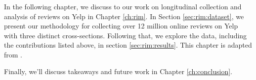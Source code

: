 In the following chapter, we discuss to our work on longitudinal collection and analysis of reviews on Yelp in Chapter \ref{ch:rim}. In Section \ref{sec:rim:dataset}, we present our methodology for collecting over 12 million online reviews on Yelp with three distinct cross-sections. Following that, we explore the data, including the contributions listed above, in section \ref{sec:rim:results}. This chapter is adapted from .

Finally, we'll discuss takeaways and future work in Chapter \ref{ch:conclusion}. 
